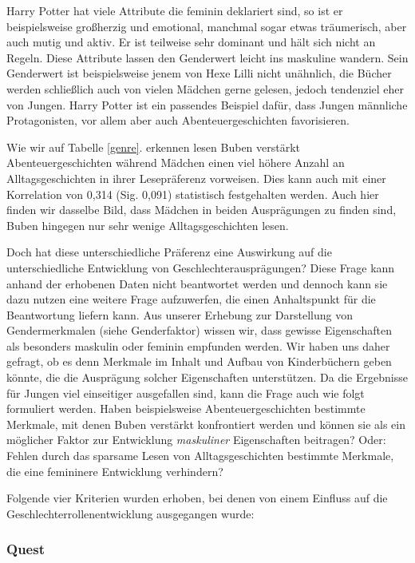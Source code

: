 Harry Potter hat viele Attribute die feminin deklariert sind, so ist er
beispielsweise großherzig und emotional, manchmal sogar etwas
träumerisch, aber auch mutig und aktiv. Er ist teilweise sehr dominant
und hält sich nicht an Regeln. Diese Attribute lassen den Genderwert
leicht ins maskuline wandern. Sein Genderwert ist beispielsweise jenem
von Hexe Lilli nicht unähnlich, die Bücher werden schließlich auch von
vielen Mädchen gerne gelesen, jedoch tendenziel eher von Jungen. Harry
Potter ist ein passendes Beispiel dafür, dass Jungen männliche
Protagonisten, vor allem aber auch Abenteuergeschichten favorisieren.

Wie wir auf Tabelle \ref{genre}. erkennen lesen Buben verstärkt
Abenteuergeschichten während Mädchen einen viel höhere Anzahl an
Alltagsgeschichten in ihrer Lesepräferenz vorweisen. Dies kann auch mit
einer Korrelation von 0,314 (Sig. 0,091) statistisch festgehalten
werden. Auch hier finden wir dasselbe Bild, dass Mädchen in beiden
Ausprägungen zu finden sind, Buben hingegen nur sehr wenige
Alltagsgeschichten lesen.

Doch hat diese unterschiedliche Präferenz eine Auswirkung auf die
unterschiedliche Entwicklung von Geschlechterausprägungen? Diese Frage
kann anhand der erhobenen Daten nicht beantwortet werden und dennoch
kann sie dazu nutzen eine weitere Frage aufzuwerfen, die einen
Anhaltspunkt für die Beantwortung liefern kann. Aus unserer Erhebung zur
Darstellung von Gendermerkmalen (siehe Genderfaktor) wissen wir, dass
gewisse Eigenschaften als besonders maskulin oder feminin empfunden
werden. Wir haben uns daher gefragt, ob es denn Merkmale im Inhalt und
Aufbau von Kinderbüchern geben könnte, die die Ausprägung solcher
Eigenschaften unterstützen. Da die Ergebnisse für Jungen viel
einseitiger ausgefallen sind, kann die Frage auch wie folgt formuliert
werden. Haben beispielsweise Abenteuergeschichten bestimmte Merkmale,
mit denen Buben verstärkt konfrontiert werden und können sie als ein
möglicher Faktor zur Entwicklung \emph{maskuliner} Eigenschaften
beitragen? Oder: Fehlen durch das sparsame Lesen von Alltagsgeschichten
bestimmte Merkmale, die eine femininere Entwicklung verhindern?

Folgende vier Kriterien wurden erhoben, bei denen von einem Einfluss auf
die Geschlechterrollenentwicklung ausgegangen wurde:

\subsubsection{Quest}

